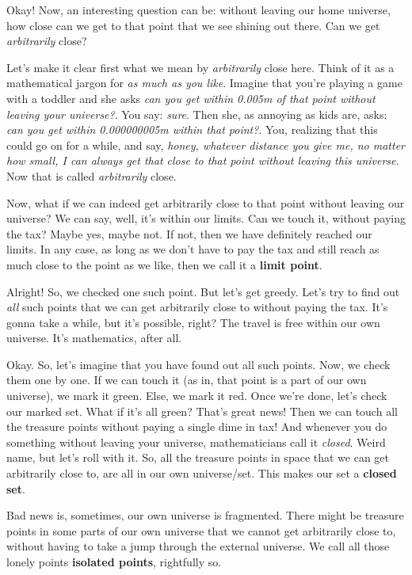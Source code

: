 \documentclass{article}
\begin{document}
Okay! Now, an interesting question can be: without leaving our home universe, how close can we get to that point that we see shining out there. Can we get \emph{arbitrarily} close?

Let's make it clear first what we mean by \emph{arbitrarily} close here. Think of it as a mathematical jargon for \emph{as much as you like}. Imagine that you're playing a game with a toddler and she asks \emph{can you get within 0.005m of that point without leaving your universe?}. You say: \emph{sure}. Then she, as annoying as kids are, asks: \emph{can you get within 0.000000005m within that point?}. You, realizing that this could go on for a while, and say, \emph{honey, whatever distance you give me, no matter how small, I can always get that close to that point without leaving this universe}. Now that is called \emph{arbitrarily} close.

Now, what if we can indeed get arbitrarily close to that point without leaving our universe? We can say, well, it's within our limits. Can we touch it, without paying the tax? Maybe yes, maybe not. If not, then we have definitely reached our limits. In any case, as long as we don't have to pay the tax and still reach as much close to the point as we like, then we call it a \textbf{limit point}.

Alright! So, we checked one such point. But let's get greedy. Let's try to find out \emph{all} such points that we can get arbitrarily close to without paying the tax. It's gonna take a while, but it's possible, right? The travel is free within our own universe. It's mathematics, after all.

Okay. So, let's imagine that you have found out all such points. Now, we check them one by one. If we can touch it (as in, that point is a part of our own universe), we mark it green. Else, we mark it red. Once we're done, let's check our marked set. What if it's all green? That's great news! Then we can touch all the treasure points without paying a single dime in tax! And whenever you do something without leaving your universe, mathematicians call it \emph{closed}. Weird name, but let's roll with it. So, all the treasure points in space that we can get arbitrarily close to, are all in our own universe/set. This makes our set a \textbf{closed set}.

Bad news is, sometimes, our own universe is fragmented. There might be treasure points in some parts of our own universe that we cannot get arbitrarily close to, without having to take a jump through the external universe. We call all those lonely points \textbf{isolated points}, rightfully so.
\end{document}
